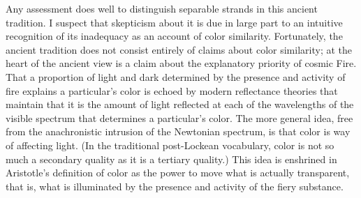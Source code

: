 Any assessment does well to distinguish separable strands in this ancient tradition. I suspect that skepticism about it is due in large part to an intuitive recognition of its inadequacy as an account of color similarity. Fortunately, the ancient tradition does not consist entirely of claims about color similarity; at the heart of the ancient view is a claim about the explanatory priority of cosmic Fire. That a proportion of light and dark determined by the presence and activity of fire explains a particular's color is echoed by modern reflectance theories that maintain that it is the amount of light reflected at each of the wavelengths of the visible spectrum that determines a particular's color. The more general idea, free from the anachronistic intrusion of the Newtonian spectrum, is that color is way of affecting light. (In the traditional post-Lockean vocabulary, color is not so much a secondary quality as it is a tertiary quality.) This idea is enshrined in Aristotle's definition of color as the power to move what is actually transparent, that is, what is illuminated by the presence and activity of the fiery substance.

